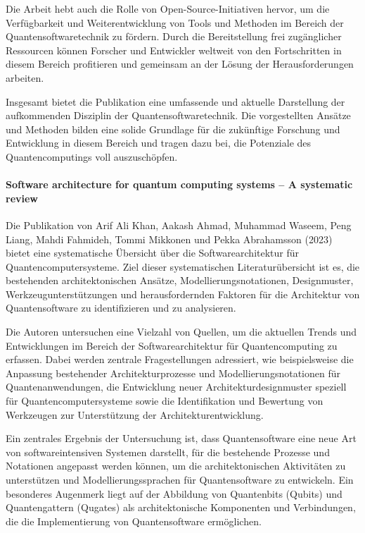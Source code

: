 Die Arbeit hebt auch die Rolle von Open-Source-Initiativen hervor, um die Verfügbarkeit und Weiterentwicklung von Tools 
und Methoden im Bereich der Quantensoftwaretechnik zu fördern. Durch die Bereitstellung frei zugänglicher Ressourcen 
können Forscher und Entwickler weltweit von den Fortschritten in diesem Bereich profitieren und gemeinsam an der Lösung 
der Herausforderungen arbeiten.

Insgesamt bietet die Publikation eine umfassende und aktuelle Darstellung der aufkommenden Disziplin der Quantensoftwaretechnik. 
Die vorgestellten Ansätze und Methoden bilden eine solide Grundlage für die zukünftige Forschung und Entwicklung in diesem 
Bereich und tragen dazu bei, die Potenziale des Quantencomputings voll auszuschöpfen.

\paragraph{Software architecture for quantum computing systems – A systematic review}

Die Publikation von Arif Ali Khan, Aakash Ahmad, Muhammad Waseem, Peng Liang, Mahdi Fahmideh, Tommi Mikkonen und Pekka 
Abrahamsson (2023) \cite{khan2023software} bietet eine systematische Übersicht über die Softwarearchitektur für Quantencomputersysteme. Ziel 
dieser systematischen Literaturübersicht ist es, die bestehenden architektonischen Ansätze, Modellierungsnotationen, 
Designmuster, Werkzeugunterstützungen und herausfordernden Faktoren für die Architektur von Quantensoftware zu 
identifizieren und zu analysieren.

Die Autoren untersuchen eine Vielzahl von Quellen, um die aktuellen Trends und Entwicklungen im Bereich der Softwarearchitektur 
für Quantencomputing zu erfassen. Dabei werden zentrale Fragestellungen adressiert, wie beispielsweise die Anpassung bestehender 
Architekturprozesse und Modellierungsnotationen für Quantenanwendungen, die Entwicklung neuer Architekturdesignmuster speziell 
für Quantencomputersysteme sowie die Identifikation und Bewertung von Werkzeugen zur Unterstützung der Architekturentwicklung.

Ein zentrales Ergebnis der Untersuchung ist, dass Quantensoftware eine neue Art von softwareintensiven Systemen darstellt, für 
die bestehende Prozesse und Notationen angepasst werden können, um die architektonischen Aktivitäten zu unterstützen und 
Modellierungssprachen für Quantensoftware zu entwickeln. Ein besonderes Augenmerk liegt auf der Abbildung von 
Quantenbits (Qubits) und Quantengattern (Qugates) als architektonische Komponenten und Verbindungen, die die 
Implementierung von Quantensoftware ermöglichen.

